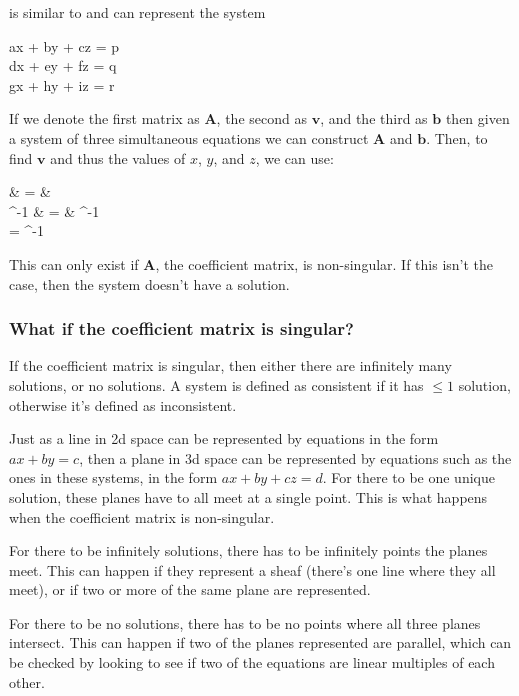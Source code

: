 is similar to and can represent the system

\begin{ea}[rCl]
	ax + by + cz = p
	\nonumber\\
	dx + ey + fz = q
	\nonumber\\
	gx + hy + iz = r
\end{ea}

If we denote the first matrix as $\mathbf{A}$, the second as ${\mathbf{v}}$, and the third as $\mathbf{b}$ then given a system of three simultaneous equations we can construct $\mathbf{A}$ and $\mathbf{b}$. Then, to find $\mathbf{v}$ and thus the values of $x$, $y$, and $z$, we can use:

\begin{ea}[rCl]
	 & = & 
	\nonumber\\
	^{-1} & = & ^{-1}
	\nonumber\\
	 = ^{-1}
\end{ea}

This can only exist if $\mathbf{A}$, the coefficient matrix, is non-singular. If this isn't the case, then the system doesn't have a solution.

\subsubsection{What if the coefficient matrix is singular?}
If the coefficient matrix is singular, then either there are infinitely many solutions, or no solutions. A system is defined as consistent if it has $\leq 1$ solution, otherwise it's defined as inconsistent.

Just as a line in 2d space can be represented by equations in the form $ax + by = c$, then a plane in 3d space can be represented by equations such as the ones in these systems, in the form $ax + by + cz = d$. For there to be one unique solution, these planes have to all meet at a single point. This is what happens when the coefficient matrix is non-singular.

For there to be infinitely solutions, there has to be infinitely points the planes meet. This can happen if they represent a sheaf (there's one line where they all meet), or if two or more of the same plane are represented.

For there to be no solutions, there has to be no points where all three planes intersect. This can happen if two of the planes represented are parallel, which can be checked by looking to see if two of the equations are linear multiples of each other.
